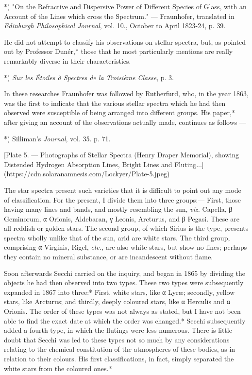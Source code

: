 \documentclass[a4paper, 12pt, oneside, polutonikogreek, english]{article}
\begin{document}
*) "On the Refractive and Dispersive Power of Different Species of Glass, with an Account of the Lines which cross the Spectrum." --- Fraunhofer, translated in \emph{Edinburgh Philosophical Journal}, vol. 10., October to April 1823-24, p. 39.

He did not attempt to classify his observations on stellar spectra, but, as pointed out by Professor Dunér,* those that he most particularly mentions are really remarkably diverse in their characteristics.

*) \emph{Sur les Étoiles à Spectres de la Troisième Classe}, p. 3.

In these researches Fraunhofer was followed by Rutherfurd, who, in the year 1863, was the first to indicate that the various stellar spectra which he had then observed were susceptible of being arranged into different groups. His paper,* after giving an account of the observations actually made, continues as follows ---

*) Silliman's \emph{Journal}, vol. 35. p. 71.

[Plate 5. --- Photographs of Stellar Spectra (Henry Draper Memorial), showing Distended Hydrogen Absorption Lines, Bright Lines and Fluting...](https://cdn.solaranamnesis.com/Lockyer/Plate-5.jpeg)

The star spectra present such varieties that it is difficult to point out any mode of classification. For the present, I divide them into three groups:--- First, those having many lines and bands, and mostly resembling the sun, \emph{viz.} Capella, β Geminorum, α Orionis, Aldebaran, γ Leonis, Arcturus, and β Pegasi. These are all reddish or golden stars. The second group, of which Sirius is the type, presents spectra wholly unlike that of the sun, arid are white stars. The third group, comprising α Virginis, Rigel, \emph{etc.}, are also white stars, but show no lines; perhaps they contain no mineral substance, or are incandescent without flame.

Soon afterwards Secchi carried on the inquiry, and began in 1865 by dividing the objects he had then observed into two types. These two types were subsequently expanded in 1867 into three:* First, white stars, like α Lyræ; secondly, yellow stars, like Arcturus; and thirdly, deeply coloured stars, like α Herculis and α Orionis. The order of these types was not always as stated, but I have not been able to find the exact date at which the order was changed.* Secchi subsequently added a fourth type, in which the flutings were less numerous. There is little doubt that Secchi was led to these types not so much by any considerations relating to the chemical constitution of the atmospheres of these bodies, as in relation to their colours. His first classifications, in fact, simply separated the white stars from the coloured ones.*
\end{document}
